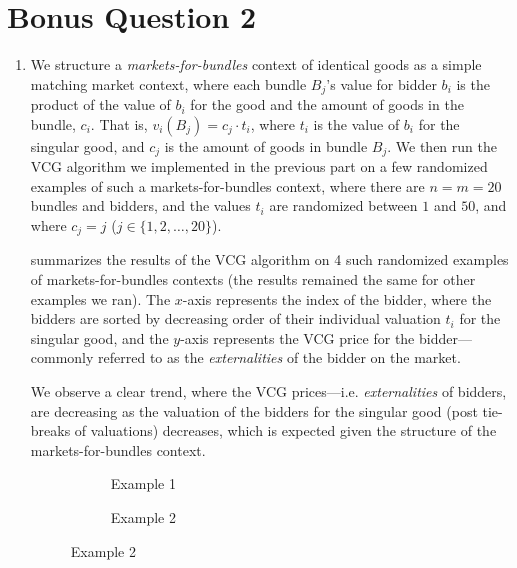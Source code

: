 \documentclass{article}
\begin{document}
\section{Bonus Question 2}

\begin{enumerate}[label=(\alph*)]

    \item We structure a \textit{markets-for-bundles} context of identical goods as a simple matching market context, where each bundle $B_j$'s value for bidder $b_i$ is the product of the value of $b_i$ for the good and the amount of goods in the bundle, $c_i$. That is, $v_{i}(B_j) = c_j \cdot t_i$, where $t_i$ is the value of $b_i$ for the singular good, and $c_j$ is the amount of goods in bundle $B_j$. We then run the VCG algorithm we implemented in the previous part on a few randomized examples of such a markets-for-bundles context, where there are $n = m = 20$ bundles and bidders, and the values $t_i$ are randomized between $1$ and $50$, and where $c_j = j$ ($j \in \{1, 2, \ldots, 20\}$).

     summarizes the results of the VCG algorithm on 4 such randomized examples of markets-for-bundles contexts (the results remained the same for other examples we ran). The $x$-axis represents the index of the bidder, where the bidders are sorted by decreasing order of their individual valuation $t_i$ for the singular good, and the $y$-axis represents the VCG price for the bidder---commonly referred to as the \textit{externalities} of the bidder on the market. 
    
    We observe a clear trend, where the VCG prices---i.e. \textit{externalities} of bidders, are decreasing as the valuation of the bidders for the singular good (post tie-breaks of valuations) decreases, which is expected given the structure of the markets-for-bundles context.

    \begin{figure}[ht]
        \centering
        \begin{subfigure}{0.49\textwidth}
            \centering
            \resizebox{\textwidth}{!}{}
            \caption{Example 1}
        \end{subfigure}
        \hfill
        \begin{subfigure}{0.49\textwidth}
            \centering
            \resizebox{\textwidth}{!}{}
            \caption{Example 2}
        \end{subfigure}
        

\end{figure}
\end{enumerate}
\end{document}

